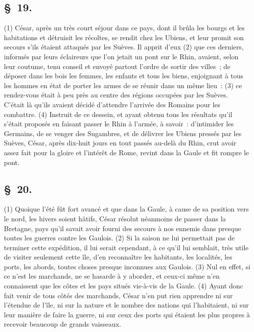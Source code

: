 \documentclass[french,twoside]{book} %
\begin{document}
\subsection[{§ 19.}]{ \textsc{§ 19.} }
\noindent (1) César, après un très court séjour dans ce pays, dont il brûla les bourgs et les habitations et détruisit les récoltes, se rendit chez les Ubiens, et leur promit son secours s’ils étaient attaqués par les Suèves. Il apprit d’eux (2) que ces derniers, informés par leurs éclaireurs que l’on jetait un pont sur le Rhin, avaient, selon leur coutume, tenu conseil et envoyé partout l’ordre de sortir des villes ; de déposer dans les bois les femmes, les enfants et tous les biens, enjoignant à tous les hommes en état de porter les armes de se réunir dans un même lieu : (3) ce rendez-vous était à peu près au centre des régions occupées par les Suèves. C’était là qu’ils avaient décidé d’attendre l’arrivée des Romains pour les combattre. (4) Instruit de ce dessein, et ayant obtenu tous les résultats qu’il s’était proposés en faisant passer le Rhin à l’armée, à savoir : d’intimider les Germains, de se venger des Sugambres, et de délivrer les Ubiens pressés par les Suèves, César, après dix-huit jours en tout passés au-delà du Rhin, crut avoir assez fait pour la gloire et l’intérêt de Rome, revint dans la Gaule et fit rompre le pont.
\subsection[{§ 20.}]{ \textsc{§ 20.} }
\noindent (1) Quoique l’été fût fort avancé et que dans la Gaule, à cause de sa position vers le nord, les hivers soient hâtifs, César résolut néanmoins de passer dans la Bretagne, pays qu’il savait avoir fourni des secours à nos ennemis dans presque toutes les guerres contre les Gaulois. (2) Si la saison ne lui permettait pas de terminer cette expédition, il lui serait cependant, à ce qu’il lui semblait, très utile de visiter seulement cette île, d’en reconnaître les habitants, les localités, les ports, les abords, toutes choses presque inconnues aux Gaulois. (3) Nul en effet, si ce n’est les marchands, ne se hasarde à y aborder, et ceux-ci même n’en connaissent que les côtes et les pays situés vis-à-vis de la Gaule. (4) Ayant donc fait venir de tous côtés des marchands, César n’en put rien apprendre ni sur l’étendue de l’île, ni sur la nature et le nombre des nations qui l’habitaient, ni sur leur manière de faire la guerre, ni sur ceux des ports qui étaient les plus propres à recevoir beaucoup de grands vaisseaux.
\end{document}
